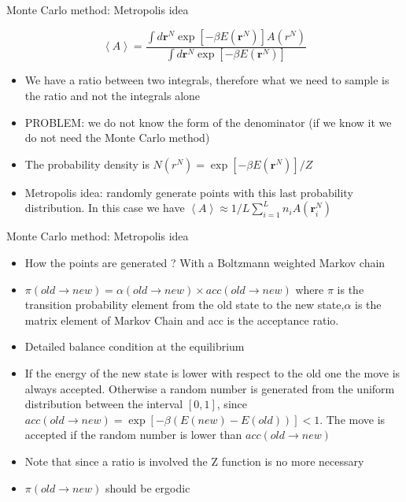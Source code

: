 \documentclass{beamer}
\begin{document}
\begin{frame}{Monte Carlo method: Metropolis idea \cite{frenkel2001understanding}}


\begin{equation}
\left\langle A \right\rangle=\dfrac{\int d\textbf{r}^{N}\exp\left[ -\beta E(\textbf{r}^{N}) \right]A(r^{N})}{\int d\textbf{r}^{N}\exp\left[ -\beta E(\textbf{r}^{N}) \right]}
\end{equation}

\begin{itemize}
\item We have a ratio between two integrals, therefore what we need to sample is the ratio and not the integrals alone
 \item PROBLEM: we do not know the form of the denominator (if we know it we do not need the Monte Carlo method)
\item The probability density is $N(r^{N})=\exp\left[-\beta E(\textbf{r}^{N}) \right]/Z$
\item Metropolis idea: randomly generate points with this last probability distribution. In this case we have $\left\langle A \right\rangle \approx 1/L\sum_{i=1}^{L}n_{i}A(\textbf{r}_{i}^{N})$

\end{itemize}
\end{frame}



\begin{frame}{Monte Carlo method: Metropolis idea \cite{frenkel2001understanding}}

\begin{itemize}

\item How the points are generated ? With a Boltzmann weighted Markov chain
\item $\pi(old \rightarrow new) = \alpha (old \rightarrow new) \times acc(old \rightarrow new) $ where $\pi$ is the transition probability element from the old state to the new state,$\alpha$ is the matrix element of Markov Chain and acc is the acceptance ratio. 
\item Detailed balance condition at the equilibrium 
\item If the energy of the new state is lower with respect to the old one the move is always accepted. Otherwise a random number is generated from the uniform distribution between the interval $[0,1]$, since $acc(old \rightarrow new) = \exp\left[ -\beta \left( E(new)-E(old) \right)\right] < 1 $. The move is accepted if the random number is lower than $acc(old \rightarrow new)$
\item Note that since a ratio is involved the Z function is no more necessary
\item $\pi(old \rightarrow new)$ should be ergodic
\end{itemize}


\end{frame}
\end{document}
